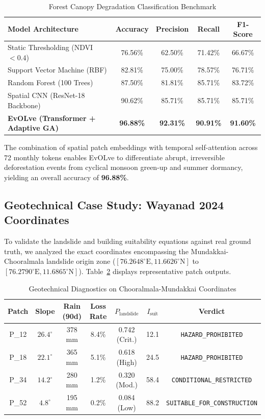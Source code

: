 \documentclass[conference]{IEEEtran}
\begin{document}
\begin{table}[htbp]
\centering
\caption{Forest Canopy Degradation Classification Benchmark}
\label{tab:model_comp}
\renewcommand{\arraystretch}{1.2}
\small
\begin{tabular}{lcccc}
\toprule
\textbf{Model Architecture} & \textbf{Accuracy} & \textbf{Precision} & \textbf{Recall} & \textbf{F1-Score} \\
\midrule
Static Thresholding (NDVI $<0.4$) & 76.56\% & 62.50\% & 71.42\% & 66.67\% \\
Support Vector Machine (RBF) & 82.81\% & 75.00\% & 78.57\% & 76.71\% \\
Random Forest (100 Trees) & 87.50\% & 81.81\% & 85.71\% & 83.72\% \\
Spatial CNN (ResNet-18 Backbone) & 90.62\% & 85.71\% & 85.71\% & 85.71\% \\
\textbf{EvOLve (Transformer + Adaptive GA)} & \textbf{96.88\%} & \textbf{92.31\%} & \textbf{90.91\%} & \textbf{91.60\%} \\
\bottomrule
\end{tabular}
\end{table}

The combination of spatial patch embeddings with temporal self-attention across 72 monthly tokens enables EvOLve to differentiate abrupt, irreversible deforestation events from cyclical monsoon green-up and summer dormancy, yielding an overall accuracy of \textbf{96.88\%}.

\subsection{Geotechnical Case Study: Wayanad 2024 Coordinates}
To validate the landslide and building suitability equations against real ground truth, we analyzed the exact coordinates encompassing the Mundakkai-Chooralmala landslide origin zone ($[76.2648^\circ\text{E}, 11.6626^\circ\text{N}]$ to $[76.2790^\circ\text{E}, 11.6865^\circ\text{N}]$). Table~\ref{tab:casestudy} displays representative patch outputs.

\begin{table}[htbp]
\centering
\caption{Geotechnical Diagnostics on Chooralmala-Mundakkai Coordinates}
\label{tab:casestudy}
\renewcommand{\arraystretch}{1.2}
\footnotesize
\begin{tabular}{ccccccc}
\toprule
\textbf{Patch} & \textbf{Slope} & \textbf{Rain (90d)} & \textbf{Loss Rate} & \textbf{$P_{\text{landslide}}$} & \textbf{$I_{\text{suit}}$} & \textbf{Verdict} \\
\midrule
P\_12 & $26.4^\circ$ & 378 mm & 8.4\% & 0.742 (Crit.) & 12.1 & \texttt{HAZARD\_PROHIBITED} \\
P\_18 & $22.1^\circ$ & 365 mm & 5.1\% & 0.618 (High) & 24.5 & \texttt{HAZARD\_PROHIBITED} \\
P\_34 & $14.2^\circ$ & 280 mm & 1.2\% & 0.320 (Mod.) & 58.4 & \texttt{CONDITIONAL\_RESTRICTED} \\
P\_52 & $4.8^\circ$ & 195 mm & 0.2\% & 0.084 (Low)  & 88.2 & \texttt{SUITABLE\_FOR\_CONSTRUCTION} \\
\bottomrule
\end{tabular}
\end{table}
\end{document}
